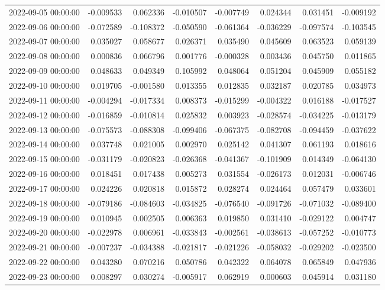 \begin{tabular}{lrrrrrrr}
2022-09-05 00:00:00 & -0.009533 & 0.062336 & -0.010507 & -0.007749 & 0.024344 & 0.031451 & -0.009192 \\
2022-09-06 00:00:00 & -0.072589 & -0.108372 & -0.050590 & -0.061364 & -0.036229 & -0.097574 & -0.103545 \\
2022-09-07 00:00:00 & 0.035027 & 0.058677 & 0.026371 & 0.035490 & 0.045609 & 0.063523 & 0.059139 \\
2022-09-08 00:00:00 & 0.000836 & 0.066796 & 0.001776 & -0.000328 & 0.003436 & 0.045750 & 0.011865 \\
2022-09-09 00:00:00 & 0.048633 & 0.049349 & 0.105992 & 0.048064 & 0.051204 & 0.045909 & 0.055182 \\
2022-09-10 00:00:00 & 0.019705 & -0.001580 & 0.013355 & 0.012835 & 0.032187 & 0.020785 & 0.034973 \\
2022-09-11 00:00:00 & -0.004294 & -0.017334 & 0.008373 & -0.015299 & -0.004322 & 0.016188 & -0.017527 \\
2022-09-12 00:00:00 & -0.016859 & -0.010814 & 0.025832 & 0.003923 & -0.028574 & -0.034225 & -0.013179 \\
2022-09-13 00:00:00 & -0.075573 & -0.088308 & -0.099406 & -0.067375 & -0.082708 & -0.094459 & -0.037622 \\
2022-09-14 00:00:00 & 0.037748 & 0.021005 & 0.002970 & 0.025142 & 0.041307 & 0.061193 & 0.018616 \\
2022-09-15 00:00:00 & -0.031179 & -0.020823 & -0.026368 & -0.041367 & -0.101909 & 0.014349 & -0.064130 \\
2022-09-16 00:00:00 & 0.018451 & 0.017438 & 0.005273 & 0.031554 & -0.026173 & 0.012031 & -0.006746 \\
2022-09-17 00:00:00 & 0.024226 & 0.020818 & 0.015872 & 0.028274 & 0.024464 & 0.057479 & 0.033601 \\
2022-09-18 00:00:00 & -0.079186 & -0.084603 & -0.034825 & -0.076540 & -0.091726 & -0.071032 & -0.089400 \\
2022-09-19 00:00:00 & 0.010945 & 0.002505 & 0.006363 & 0.019850 & 0.031410 & -0.029122 & 0.004747 \\
2022-09-20 00:00:00 & -0.022978 & 0.006961 & -0.033843 & -0.002561 & -0.038613 & -0.057252 & -0.010773 \\
2022-09-21 00:00:00 & -0.007237 & -0.034388 & -0.021817 & -0.021226 & -0.058032 & -0.029202 & -0.023500 \\
2022-09-22 00:00:00 & 0.043280 & 0.070216 & 0.050786 & 0.042322 & 0.064078 & 0.065849 & 0.047936 \\
2022-09-23 00:00:00 & 0.008297 & 0.030274 & -0.005917 & 0.062919 & 0.000603 & 0.045914 & 0.031180 \\

\end{tabular}
